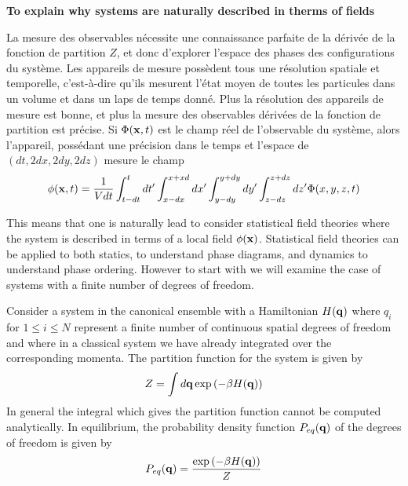 {\color{red} \textbf{To explain why systems are naturally described in therms of fields}

La mesure des observables nécessite une connaissance parfaite de la dérivée de la fonction de partition $Z$, et donc d'explorer l'espace des phases des configurations du système. Les appareils de mesure possèdent tous une résolution spatiale et temporelle, c'est-à-dire qu'ils mesurent l'état moyen de toutes les particules dans un volume et dans un laps de temps donné. Plus la résolution des appareils de mesure est bonne, et plus la mesure des observables dérivées de la fonction de partition est précise. Si $\Phi({\bf x},t)$ est le champ réel de l'observable du système, alors l'appareil, possédant une précision dans le temps et l'espace de $(dt,2dx,2dy,2dz)$ mesure le champ
\begin{align}
    \phi({\bf x},t) = \frac{1}{V dt} \int_{t-dt}^{t} dt' \int_{x-dx}^{x+xd} dx' \int_{y-dy}^{y+dy} dy' \int_{z-dz}^{z+dz} dz' \Phi(x,y,z,t)
    \label{renormalisation}
\end{align}
}

This means that one is naturally lead to consider statistical field theories where the system is described in terms of a local field $\phi({\bf x})$. Statistical field theories can be applied to both statics, to understand phase diagrams, and dynamics to understand phase ordering. However to start with we will examine the case of systems with a finite number of degrees of freedom. 

Consider a system in the canonical ensemble with a Hamiltonian $H({\bf q})$ where $q_i$ for 
$1\leq i\leq N$ represent a finite number of continuous spatial degrees of freedom and where in a classical system we have already integrated over the corresponding momenta. The partition function for the system is given by
\begin{equation}
    Z = \int d{\bf q} \exp\left(-\beta H({\bf q})\right)
\end{equation}
In general the integral which gives the  partition function cannot be computed analytically. In equilibrium, the probability density function $P_{eq}({\bf q})$ of the degrees of freedom is given by 
\begin{equation}
    P_{eq}({\bf q}) = \frac{\exp\left(-\beta H({\bf q})\right)}{Z}
    \label{eqdis}
\end{equation}

